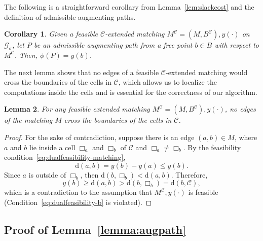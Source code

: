 \documentclass[11pt,onecolumn]{article}
\def\mcC{{\mathcal{C}}}
\def\mcG{{\mathcal{G}}}
\newcommand{\netcost}{\phi}
\newcommand{\cell}{\Box}
\newcommand{\distance}[2]{\mathrm{d}(#1, #2)}
\newtheorem{lemma}{Lemma}[section]
\newtheorem{corollary}[lemma]{Corollary}
\begin{document}
The following is a straightforward corollary from Lemma~\ref{lem:slackcost} and the definition of admissible augmenting paths.

\begin{corollary}
\label{cor:slackcost}
Given a feasible $\mcC$-extended matching $M^{\mcC} = (M, B^{\mcC}),y(\cdot)$ on $\mcG_\sigma$, let $P$ be an admissible augmenting path from a free point $b\in B$ with respect to $M^{\mcC}$. Then, $\phi(P)= y(b)$.
\end{corollary}

The next lemma shows that no edges of a feasible $\mcC$-extended matching would cross the boundaries of the cells in $\mcC$, which allows us to localize the computations inside the cells and is essential for the correctness of our algorithm.

\begin{lemma}\label{lemma:no-cross}
    For any feasible extended matching $M^\mcC=(M, B^\mcC), y(\cdot)$, no edges of the matching $M$ cross the boundaries of the cells in $\mcC$.
\end{lemma}
\begin{proof}
    For the sake of contradiction, suppose there is an edge $(a,b)\in M$, where $a$ and $b$ lie inside a cell $\cell_a$ and $\cell_b$ of $\mcC$ and $\cell_a\neq \cell_b$. By the feasibility condition~\eqref{eq:dualfeasibility-matching},
    \begin{equation*}
        \distance{a}{b} = y(b) - y(a) \le y(b).
    \end{equation*}
    Since $a$ is outside of $\cell_b$, then $\distance{b}{\cell_b}<\distance{a}{b}$. Therefore, 
    \[y(b)\ge \distance{a}{b}> \distance{b}{\cell_b}=\distance{b}{\mcC},\]
    which is a contradiction to the assumption that $M^\mcC, y(\cdot)$ is feasible (Condition~\eqref{eq:dualfeasibility-b} is violated).
\end{proof}


\subsection{Proof of Lemma~\ref{lemma:augpath}}

\netcost*
\end{document}
